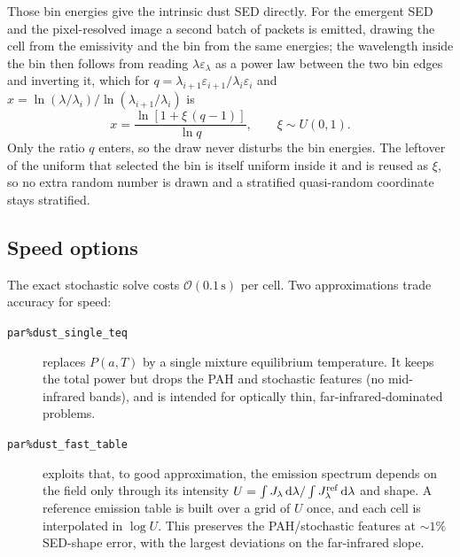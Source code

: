 \documentclass[english,a4paper]{kiseon_memo}
\newcommand{\Jlam}{J_\lambda}
\newcommand{\dd}{\mathrm{d}}
\newcommand{\pp}[1]{\texttt{par\%#1}}
\begin{document}
Those bin energies give the intrinsic dust SED directly.  For the emergent SED
and the pixel-resolved image a second batch of packets is emitted, drawing the
cell from the emissivity and the bin from the same energies; the wavelength
inside the bin then follows from reading $\lambda\varepsilon_\lambda$ as a power
law between the two bin edges and inverting it, which for
$q=\lambda_{i+1}\varepsilon_{i+1}/\lambda_i\varepsilon_i$ and
$x=\ln(\lambda/\lambda_i)/\ln(\lambda_{i+1}/\lambda_i)$ is
\begin{equation}
  x = \frac{\ln\!\left[1+\xi\,(q-1)\right]}{\ln q},
  \qquad \xi \sim U(0,1).
  \label{eq:powerlawbin}
\end{equation}
Only the ratio $q$ enters, so the draw never disturbs the bin energies.  The
leftover of the uniform that selected the bin is itself uniform inside it and is
reused as $\xi$, so no extra random number is drawn and a stratified
quasi-random coordinate stays stratified.

\subsection{Speed options}
The exact stochastic solve costs $\mathcal O(0.1\,\mathrm{s})$ per cell.  Two
approximations trade accuracy for speed:
\begin{description}
\item[\pp{dust\_single\_teq}] replaces $P(a,T)$ by a single mixture equilibrium
  temperature.  It keeps the total power but drops the PAH and stochastic
  features (no mid-infrared bands), and is intended for optically thin,
  far-infrared-dominated problems.
\item[\pp{dust\_fast\_table}] exploits that, to good approximation, the emission
  spectrum depends on the field only through its intensity
  $U=\int\Jlam\,\dd\lambda/\int J_\lambda^{\rm ref}\,\dd\lambda$ and shape.  A
  reference emission table is built over a grid of $U$ once, and each cell is
  interpolated in $\log U$.  This preserves the PAH/stochastic features at
  $\sim1\%$ SED-shape error, with the largest deviations on the far-infrared
  slope.
\end{description}
\end{document}
